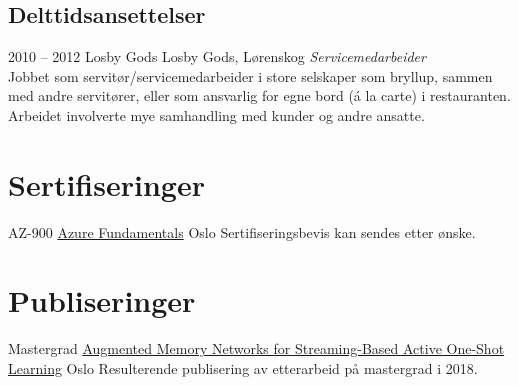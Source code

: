 \documentclass[]{friggeri-cv} %
\begin{document}



\subsection{Delttidsansettelser}

\begin{entrylist}


\entry
{2010 -- 2012}
{Losby Gods}
{Losby Gods, Lørenskog}
{\emph{Servicemedarbeider} \\
Jobbet som servitør/servicemedarbeider i store selskaper som bryllup, sammen med andre servitører, eller som ansvarlig for egne bord (\'{a} la carte) i restauranten. Arbeidet involverte mye samhandling med kunder og andre ansatte.}



\end{entrylist}






\section{Sertifiseringer}
\begin{entrylist}
\entry
{AZ-900}
{\href{https://docs.microsoft.com/en-us/certifications/exams/az-900}{Azure Fundamentals}}
{Oslo}
{Sertifiseringsbevis kan sendes etter ønske.}

\end{entrylist}



\section{Publiseringer}
\begin{entrylist}
\entry
{Mastergrad}
{\href{https://arxiv.org/abs/1909.01757}{Augmented Memory Networks for Streaming-Based Active One-Shot Learning}}
{Oslo}
{Resulterende publisering av etterarbeid på mastergrad i 2018.}

\end{entrylist}
\end{document}
